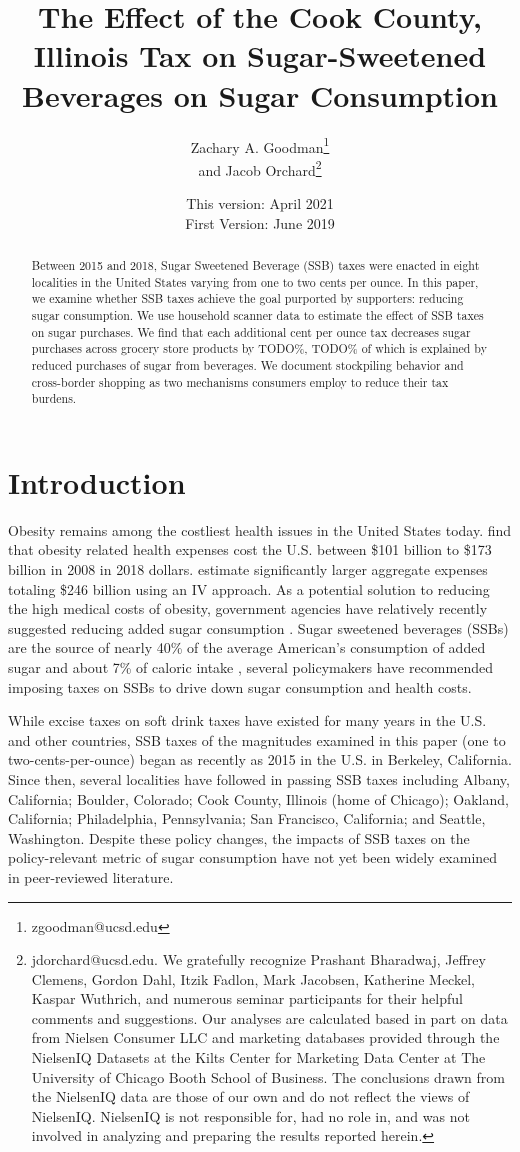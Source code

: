 \documentclass[12pt]{article}
\title{The Effect of the Cook County, Illinois Tax on Sugar-Sweetened Beverages on Sugar Consumption}
\author{Zachary A. Goodman\thanks{zgoodman@ucsd.edu}\\ and Jacob Orchard\thanks{jdorchard@ucsd.edu. We gratefully recognize Prashant Bharadwaj, Jeffrey Clemens, Gordon Dahl, Itzik Fadlon, Mark Jacobsen, Katherine Meckel, Kaspar Wuthrich, and numerous seminar participants for their helpful comments and suggestions. Our analyses are calculated based in part on data from Nielsen Consumer LLC and marketing databases provided through the NielsenIQ Datasets at the Kilts Center for Marketing Data Center at The University of Chicago Booth School of Business. The conclusions drawn from the NielsenIQ data are those of our own and do not reflect the views of NielsenIQ. NielsenIQ is not responsible for, had no role in, and was not involved in analyzing and preparing the results reported herein.}}
\affil{University of California, San Diego}
\date{This version: April 2021\\
First Version: June 2019}
\begin{document}
\maketitle

\begin{abstract}
Between 2015 and 2018, Sugar Sweetened Beverage (SSB) taxes were enacted in eight localities in the United States varying from one to two cents per ounce. In this paper, we examine whether SSB taxes achieve the goal purported by supporters: reducing sugar consumption. We use household scanner data to estimate the effect of SSB taxes on sugar purchases. We find that each additional cent per ounce tax decreases sugar purchases across grocery store products by TODO\%, TODO\% of which is explained by reduced purchases of sugar from beverages. We document stockpiling behavior and cross-border shopping as two mechanisms consumers employ to reduce their tax burdens.
\end{abstract}

\pagebreak


\doublespacing

\section{Introduction} \label{introduction}

Obesity remains among the costliest health issues in the United States today. \textcite{finkelstein2009annual} find that obesity related health expenses cost the U.S. between \$101 billion to \$173 billion in 2008 in 2018 dollars. \textcite{cawley2012medical} estimate significantly larger aggregate expenses totaling \$246 billion using an IV approach.  As a potential solution to reducing the high medical costs of obesity, government agencies have relatively recently suggested reducing added sugar consumption \parencite{dietary2015dietary}. Sugar sweetened beverages (SSBs) are the source of nearly 40\% of the average American's consumption of added sugar \parencite{dietary2015dietary} and about 7\% of caloric intake \parencite{allcott2019should}, several policymakers have recommended imposing taxes on SSBs to drive down sugar consumption and health costs.

While excise taxes on soft drink taxes have existed for many years in the U.S. and other countries, SSB taxes of the magnitudes examined in this paper (one to two-cents-per-ounce) began as recently as 2015 in the U.S. in Berkeley, California. Since then, several localities have followed in passing SSB taxes including Albany, California; Boulder, Colorado; Cook County, Illinois (home of Chicago); Oakland, California; Philadelphia, Pennsylvania; San Francisco, California; and Seattle, Washington. Despite these policy changes, the impacts of SSB taxes on the policy-relevant metric of sugar consumption have not yet been widely examined in peer-reviewed literature.
\end{document}
